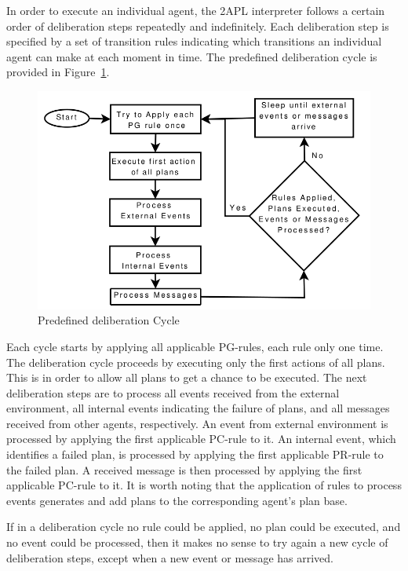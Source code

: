 \documentclass[a4paper]{article}
\begin{document}
In order to execute an individual agent, the 2APL interpreter follows a certain order of deliberation steps repeatedly and indefinitely. Each deliberation step is specified by a set of transition rules indicating which transitions an individual agent can make at each moment in time. The predefined deliberation cycle is provided in Figure~\ref{fig:deliberation_cycle}.

\begin{figure}[htp]
\centering
\includegraphics[keepaspectratio,scale=0.35]{fig/rcycle.png}
\caption{Predefined deliberation Cycle}
\label{fig:deliberation_cycle}
\end{figure}
 
Each cycle starts by applying all applicable PG-rules, each rule only one time. The deliberation cycle proceeds by executing only the first actions of all plans. This is in order to allow all plans to get a chance to be executed. The next deliberation steps are to
process all events received from the external environment, all internal events indicating the failure of plans, and all messages received from other agents, respectively. An event from external environment is processed by applying the first applicable PC-rule to it. An internal event, which identifies a failed plan, is processed by applying the first applicable PR-rule to the failed plan. A received message is then processed by applying the first applicable PC-rule to it. It is worth noting that the application of rules
to process events generates and add plans to the corresponding agent’s plan base.

If in a deliberation cycle no rule could be applied, no plan could be executed, and no event could be processed, then it makes no sense to try again a new cycle of deliberation steps, except when a new event or message has arrived.
\end{document}

